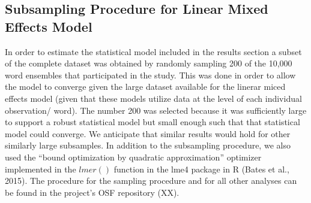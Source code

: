 \documentclass[
  ,man,floatsintext]{apa6}
\begin{document}
\hypertarget{subsampling-procedure-for-linear-mixed-effects-model}{%
\subsection{Subsampling Procedure for Linear Mixed Effects Model}\label{subsampling-procedure-for-linear-mixed-effects-model}}

In order to estimate the statistical model included in the results section a subset of the complete dataset was obtained by randomly sampling 200 of the 10,000 word ensembles that participated in the study. This was done in order to allow the model to converge given the large dataset available for the linerar miced effects model (given that these models utilize data at the level of each individual observation/ word). The number 200 was selected because it was sufficiently large to support a robust statistical model but small enough such that that statistical model could converge. We anticipate that similar results would hold for other similarly large subsamples. In addition to the subsampling procedure, we also used the ``bound optimization by quadratic approximation'' optimizer implemented in the \(lmer()\) function in the lme4 package in R (Bates et al., 2015). The procedure for the sampling procedure and for all other analyses can be found in the project's OSF repository (XX).


\clearpage
\renewcommand{\listtablename}{Table captions}
\end{document}
